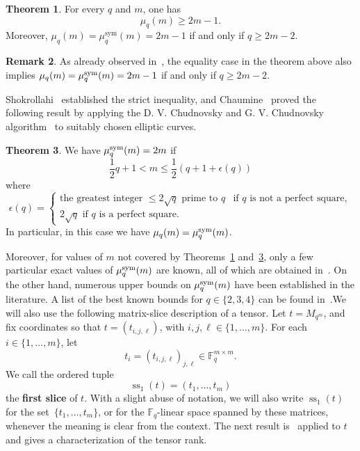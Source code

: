\documentclass[11pt,a4paper,reqno]{article}
\numberwithin{equation}{section}
\theoremstyle{definition}
\newtheorem{theorem}{Theorem}[section]
\newtheorem{remark}[theorem]{Remark}
\def\sym{\textup{sym}}
\begin{document}
\begin{theorem}\label{thm:burg}
For every \(q\) and \(m\), one has
\[
\mu_q(m)\geq 2m-1.
\]
Moreover, $\mu_q(m)=\mu_q^{\mathrm{sym}}(m)=2m-1$ if and only if \(q\geq 2m-2\).
\end{theorem}

\begin{remark}\label{rem:burg}
    As already observed in~\cite[Section~9.1]{ballet2021tensor}, the equality case in the theorem above also implies $\mu_q(m)=\mu_q^\sym(m)=2m-1$ if and only if $q\geq 2m-2$.
\end{remark}

Shokrollahi~\cite{shokrollahi1992optimal} established the strict inequality, and Chaumine~\cite{chaumine2006bilinear} proved the following result by applying the D. V. Chudnovsky and G. V. Chudnovsky algorithm~\cite{chudnovsky1988algebraic} to suitably chosen elliptic curves.

\begin{theorem}\label{thm:shok}
    We have $\mu_q^\sym(m)=2m$ if 
    \begin{equation*}
        \frac{1}{2}q+1<m\leq \frac{1}{2}(q+1+\epsilon(q))
    \end{equation*}
    where
    \begin{equation*}
        \epsilon(q)=\begin{cases}
            \text{the greatest integer $\leq 2\sqrt{q}$ prime to $q$} & \text{if $q$ is not a perfect square},\\
            \text{$2\sqrt{q}$ if $q$ is a perfect square}.
        \end{cases}
    \end{equation*}
    In particular, in this case we have $\mu_q(m)=\mu_q^\sym(m)$.
\end{theorem}

Moreover, for values of $m$ not covered by Theorems~\ref{thm:burg} and~\ref{thm:shok}, only a few particular exact values of $\mu_q^\sym(m)$ are known, all of which are obtained in~\cite{chudnovsky1988algebraic}. On the other hand, numerous upper bounds on $\mu_q^\sym(m)$ have been established in the literature. A list of the best known bounds for $q\in\{2,3,4\}$ can be found in~\cite[Table~2]{ballet2021tensor}.We will also use the following matrix-slice description of a tensor. Let
\(t=M_{q^m}\), and fix coordinates so that \(t=(t_{i,j,\ell})\), with
\(i,j,\ell\in\{1,\ldots,m\}\). For each \(i\in\{1,\ldots,m\}\), let
\[
t_i=(t_{i,j,\ell})_{j,\ell}\in \mathbb F_q^{m\times m}.
\]
We call the ordered tuple
\[
\operatorname{ss}_1(t)=(t_1,\ldots,t_m)
\]
the \textbf{first slice} of \(t\). With a slight abuse of notation, we will also write
\(\operatorname{ss}_1(t)\) for the set~\(\{t_1,\ldots,t_m\}\), or for the
\(\mathbb F_q\)-linear space spanned by these matrices, whenever the meaning is clear from
the context. The next result is~\cite[Proposition~14.45]{burgisser2013algebraic} applied to $t$ and gives a characterization of the tensor rank.
\end{document}
